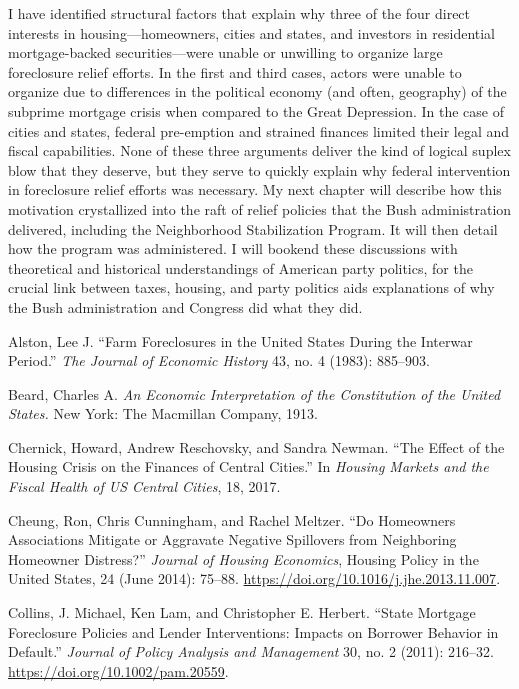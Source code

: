 \documentclass[
]{article}
\begin{document}
I have identified structural factors that explain why three of the four
direct interests in housing---homeowners, cities and states, and
investors in residential mortgage-backed securities---were unable or
unwilling to organize large foreclosure relief efforts. In the first and
third cases, actors were unable to organize due to differences in the
political economy (and often, geography) of the subprime mortgage crisis
when compared to the Great Depression. In the case of cities and states,
federal pre-emption and strained finances limited their legal and fiscal
capabilities. None of these three arguments deliver the kind of logical
suplex blow that they deserve, but they serve to quickly explain why
federal intervention in foreclosure relief efforts was necessary. My
next chapter will describe how this motivation crystallized into the
raft of relief policies that the Bush administration delivered,
including the Neighborhood Stabilization Program. It will then detail
how the program was administered. I will bookend these discussions with
theoretical and historical understandings of American party politics,
for the crucial link between taxes, housing, and party politics aids
explanations of why the Bush administration and Congress did what they
did.

\hypertarget{refs}{}
\leavevmode\hypertarget{ref-alston1983farm}{}%
Alston, Lee J. ``Farm Foreclosures in the United States During the
Interwar Period.'' \emph{The Journal of Economic History} 43, no. 4
(1983): 885--903.

\leavevmode\hypertarget{ref-beardEconomicInterpretationConstitution1913}{}%
Beard, Charles A. \emph{An Economic Interpretation of the Constitution
of the United States.} New York: The Macmillan Company, 1913.

\leavevmode\hypertarget{ref-chernick2017effect}{}%
Chernick, Howard, Andrew Reschovsky, and Sandra Newman. ``The Effect of
the Housing Crisis on the Finances of Central Cities.'' In \emph{Housing
Markets and the Fiscal Health of US Central Cities}, 18, 2017.

\leavevmode\hypertarget{ref-cheung2014homeowners}{}%
Cheung, Ron, Chris Cunningham, and Rachel Meltzer. ``Do Homeowners
Associations Mitigate or Aggravate Negative Spillovers from Neighboring
Homeowner Distress?'' \emph{Journal of Housing Economics}, Housing
Policy in the United States, 24 (June 2014): 75--88.
\url{https://doi.org/10.1016/j.jhe.2013.11.007}.

\leavevmode\hypertarget{ref-collins2011state}{}%
Collins, J. Michael, Ken Lam, and Christopher E. Herbert. ``State
Mortgage Foreclosure Policies and Lender Interventions: Impacts on
Borrower Behavior in Default.'' \emph{Journal of Policy Analysis and
Management} 30, no. 2 (2011): 216--32.
\url{https://doi.org/10.1002/pam.20559}.
\end{document}
